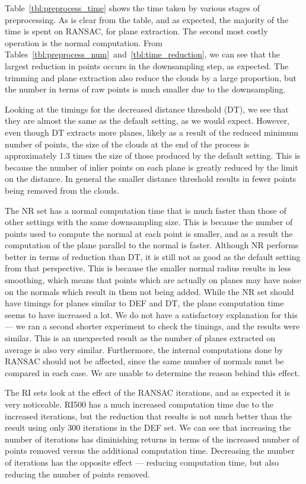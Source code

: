 \documentclass[11pt,a4paper]{kth-mag}
\begin{document}
Table~\ref{tbl:preprocess_time} shows the time taken by various stages of
preprocessing. As is clear from the table, and as expected, the majority of the
time is spent on RANSAC, for plane extraction. The second most costly operation
is the normal computation. From
Tables~\ref{tbl:preprocess_num}~and~\ref{tbl:time_reduction}, we can see that
the largest reduction in points occurs in the downsampling step, as expected.
The trimming and plane extraction also reduce the clouds by a large proportion,
but the number in terms of raw points is much smaller due to the downsampling.

Looking at the timings for the decreased distance threshold (DT), we see that
they are almost the same as the default setting, as we would expect. However,
even though DT extracts more planes, likely as a result of the reduced minimum
number of points, the size of the clouds at the end of the process is
approximately 1.3 times the size of those produced by the default setting. This
is because the number of inlier points on each plane is greatly reduced by the
limit on the distance. In general the smaller distance threshold results in
fewer points being removed from the clouds.

The NR set has a normal computation time that is much faster than those of other
settings with the same downsampling size. This is because the number of points
used to compute the normal at each point is smaller, and as a result the
computation of the plane parallel to the normal is faster. Although NR performs
better in terms of reduction than DT, it is still not as good as the default
setting from that perspective. This is because the smaller normal radius results
in less smoothing, which means that points which are actually on planes may have
noise on the normals which result in them not being added. While the NR set
should have timings for planes similar to DEF and DT, the plane computation time
seems to have increased a lot. We do not have a satisfactory explanation for
this --- we ran a second shorter experiment to check the timings, and the
results were similar. This is an unexpected result as the number of planes
extracted on average is also very similar. Furthermore, the internal
computations done by RANSAC should not be affected, since the same number of
normals must be compared in each case. We are unable to determine the reason
behind this effect.

The RI sets look at the effect of the RANSAC iterations, and as expected it is
very noticeable. RI500 has a much increased computation time due to the
increased iterations, but the reduction that results is not much better than the
result using only 300 iterations in the DEF set. We can see that increasing the
number of iterations has diminishing returns in terms of the increased number of
points removed versus the additional computation time. Decreasing the number of
iterations has the opposite effect --- reducing computation time, but also
reducing the number of points removed.
\end{document}
